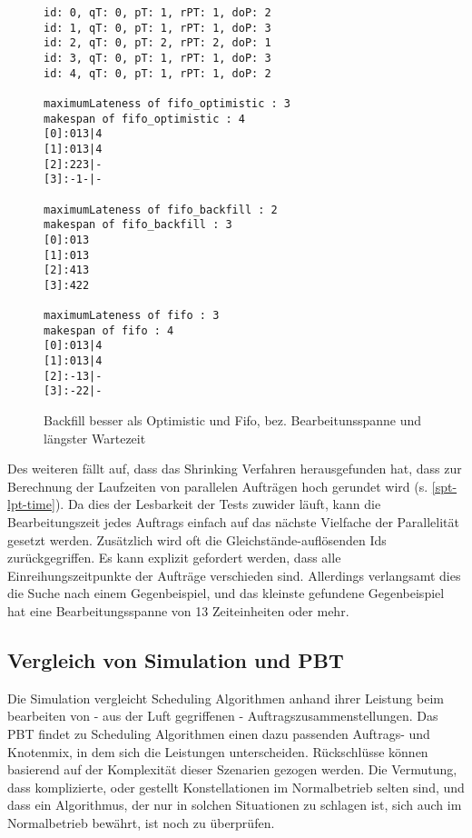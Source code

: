 \begin{figure}
	\centering
	\begin{verbatim}
id: 0, qT: 0, pT: 1, rPT: 1, doP: 2
id: 1, qT: 0, pT: 1, rPT: 1, doP: 3
id: 2, qT: 0, pT: 2, rPT: 2, doP: 1
id: 3, qT: 0, pT: 1, rPT: 1, doP: 3
id: 4, qT: 0, pT: 1, rPT: 1, doP: 2

maximumLateness of fifo_optimistic : 3
makespan of fifo_optimistic : 4
[0]:013|4
[1]:013|4
[2]:223|-
[3]:-1-|-

maximumLateness of fifo_backfill : 2
makespan of fifo_backfill : 3
[0]:013
[1]:013
[2]:413
[3]:422

maximumLateness of fifo : 3
makespan of fifo : 4
[0]:013|4
[1]:013|4
[2]:-13|-
[3]:-22|-
\end{verbatim}
\caption{Backfill besser als Optimistic und Fifo, bez. Bearbeitunsspanne und längster Wartezeit}
\label{everything}
\end{figure}

Des weiteren fällt auf, dass das Shrinking Verfahren herausgefunden hat, dass zur Berechnung der Laufzeiten von parallelen Aufträgen hoch gerundet wird (s. \ref{spt-lpt-time}). Da dies der Lesbarkeit der Tests zuwider läuft, kann die Bearbeitungszeit jedes Auftrags einfach auf das nächste Vielfache der Parallelität gesetzt werden.
Zusätzlich wird oft die Gleichstände-auflösenden Ids zurückgegriffen. Es kann explizit gefordert werden, dass alle Einreihungszeitpunkte der Aufträge verschieden sind. Allerdings verlangsamt dies die Suche nach einem Gegenbeispiel, und das kleinste gefundene Gegenbeispiel hat eine Bearbeitungsspanne von 13 Zeiteinheiten oder mehr.\\
\FloatBarrier

\subsection{Vergleich von Simulation und PBT}
\label{prop-sim}
Die Simulation vergleicht Scheduling Algorithmen anhand ihrer Leistung beim bearbeiten von - aus der Luft gegriffenen - Auftragszusammenstellungen. Das PBT findet zu Scheduling Algorithmen einen dazu passenden Auftrags- und Knotenmix, in dem sich die Leistungen unterscheiden. Rückschlüsse können basierend auf der Komplexität dieser Szenarien gezogen werden. Die Vermutung, dass komplizierte, oder gestellt Konstellationen im Normalbetrieb selten sind, und dass ein Algorithmus, der nur in solchen Situationen zu schlagen ist, sich auch im Normalbetrieb bewährt, ist noch zu überprüfen.\\

